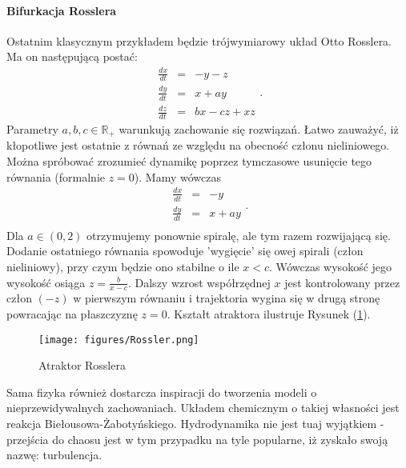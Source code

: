 \documentclass[12pt]{article}
\begin{document}
\paragraph{Bifurkacja Rosslera}
Ostatnim klasycznym przykładem będzie trójwymiarowy układ Otto Rosslera. Ma on następującą postać:
\begin{equation}
\begin{array}{rcl} 
\frac{dx}{dt} & = & -y-z \\
\frac{dy}{dt} & = & x+ay \\
\frac{dz}{dt} & = & bx-cz+xz
\end{array}.
\end{equation}
Parametry $ a,b,c \in \mathbb{R}_{+} $ warunkują zachowanie się rozwiązań. \newline
Łatwo zauważyć, iż kłopotliwe jest ostatnie z równań ze względu na obecność członu nieliniowego. Można spróbować zrozumieć dynamikę poprzez tymczasowe usunięcie tego równania (formalnie $ z = 0 $). Mamy wówczas
\begin{equation}
\begin{array}{rcl} 
\frac{dx}{dt} & = & -y \\
\frac{dy}{dt} & = & x+ay \\
\end{array}.
\end{equation}
Dla $ a \in (0,2) $ otrzymujemy ponownie spiralę, ale tym razem rozwijającą się. Dodanie ostatniego równania spowoduje 'wygięcie' się owej spirali (człon nieliniowy), przy czym będzie ono stabilne o ile $ x<c $. Wówczas wysokość jego wysokość osiąga $ z = \frac{b}{x-c} $. Dalszy wzrost współrzędnej $ x $ jest kontrolowany przez człon $ (-z) $ w pierwszym równaniu i trajektoria wygina się w drugą stronę powracając na płaszczyznę $ z=0 $. Kształt atraktora ilustruje Rysunek (\ref{Fig11}).
\begin{figure}[H]
	\texttt{[image: figures/Rossler.png]} 
	\centering
	\caption{Atraktor Rosslera}
	\label{Fig11}
\end{figure}
Sama fizyka również dostarcza inspiracji do tworzenia modeli o nieprzewidywalnych zachowaniach. Układem chemicznym o takiej własności jest reakcja Biełousowa-Żabotyńskiego. Hydrodynamika nie jest tuaj wyjątkiem - przejścia do chaosu jest w tym przypadku na tyle popularne, iż zyskało swoją nazwę: turbulencja.
\end{document}
